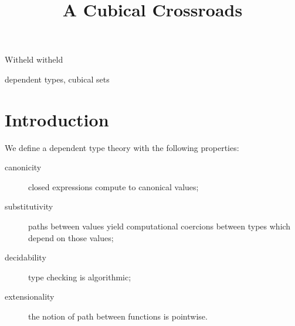 \documentclass{sigplanconf}
\begin{document}
\setlength{\pdfpageheight}{\paperheight}
\setlength{\pdfpagewidth}{\paperwidth}






\title{A Cubical Crossroads}

           {Witheld}
           {witheld}

\maketitle

\begin{abstract}
\end{abstract}



\keywords
dependent types, cubical sets

\section{Introduction}

We define a dependent type theory with the following properties:
\begin{description}
\item[canonicity] closed expressions compute to canonical values;
\item[substitutivity] paths between values yield
  computational coercions between types which depend on those values;
\item[decidability] type checking is algorithmic;
\item[extensionality] the notion of path between
  functions is pointwise.
\end{description}
\end{document}
